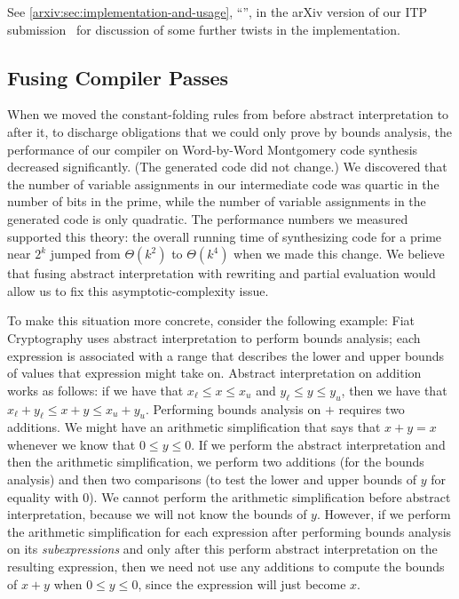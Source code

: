 \documentclass[sn-mathphys,pdflatex]{sn-jnl}%
\newcommand{\arxivautonameref}[1]{\autoref*{arxiv:#1}, ``\nameref*{arxiv:#1}''}
\newcommand{\arxivautoreflong}[1]{\arxivautonameref{#1}, in the arXiv version of our ITP submission~\cite{RewritingITP2022}%
\let\arxivautoref\arxivautorefshort}
\newcommand{\arxivautorefshort}[1]{\arxivautonameref{#1}, in~\cite{RewritingITP2022}}
\let\arxivautoref\arxivautoreflong
\theoremstyle{thmstyleone}%
\theoremstyle{thmstyletwo}%
\theoremstyle{thmstylethree}%
\begin{document}
See \arxivautoreflong{sec:implementation-and-usage} for discussion of some further twists in the implementation.


\subsection{Fusing Compiler Passes}\label{sec:fusing-compiler-passes}

When we moved the
constant-folding rules
from before abstract interpretation to after it, to discharge obligations that we could only prove by bounds analysis, the performance of our compiler on Word-by-Word Montgomery code synthesis decreased significantly.
(The generated code did not change.)
We discovered that the number of variable assignments in our intermediate code was quartic in the number of bits in the prime, while the number of variable assignments in the generated code is only quadratic.
The performance numbers we measured supported this theory: the overall running time of synthesizing code for a prime near $2^k$ jumped from $\Theta(k^2)$ to $\Theta(k^4)$ when we made this change.
We believe that fusing abstract interpretation with rewriting and partial evaluation would allow us to fix this asymptotic-complexity issue.

To make this situation more concrete, consider the following example:
Fiat Cryptography uses abstract interpretation to perform bounds analysis; each expression is associated with a range that describes the lower and upper bounds of values that expression might take on.
Abstract interpretation on addition works as follows: if we have that $x_\ell \le x \le x_u$ and $y_\ell \le y \le y_u$, then we have that $x_\ell + y_\ell \le x + y \le x_u + y_u$.
Performing bounds analysis on $+$ requires two additions.
We might have an arithmetic simplification that says that $x + y = x$ whenever we know that $0 \le y \le 0$.
If we perform the abstract interpretation and then the arithmetic simplification, we perform two additions (for the bounds analysis) and then two comparisons (to test the lower and upper bounds of $y$ for equality with 0).
We cannot perform the arithmetic simplification before abstract interpretation, because we will not know the bounds of $y$.
However, if we perform the arithmetic simplification for each expression after performing bounds analysis on its \emph{subexpressions} and only after this perform abstract interpretation on the resulting expression, then we need not use any additions to compute the bounds of $x + y$ when $0 \le y \le 0$, since the expression will just become $x$.
\end{document}
